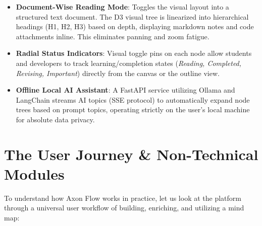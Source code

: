 \documentclass[12pt, a4paper]{article}
\begin{document}
\begin{itemize}[leftmargin=*]
  \item \textbf{Document-Wise Reading Mode}: Toggles the visual layout into a structured text document. The D3 visual tree is linearized into hierarchical headings (H1, H2, H3) based on depth, displaying markdown notes and code attachments inline. This eliminates panning and zoom fatigue.
  
  \item \textbf{Radial Status Indicators}: Visual toggle pins on each node allow students and developers to track learning/completion states (\textit{Reading, Completed, Revising, Important}) directly from the canvas or the outline view.
  
  \item \textbf{Offline Local AI Assistant}: A FastAPI service utilizing Ollama and LangChain streams AI topics (SSE protocol) to automatically expand node trees based on prompt topics, operating strictly on the user's local machine for absolute data privacy.
\end{itemize}

\newpage

\section{The User Journey \& Non-Technical Modules}

To understand how Axon Flow works in practice, let us look at the platform through a universal user workflow of building, enriching, and utilizing a mind map:
\end{document}
